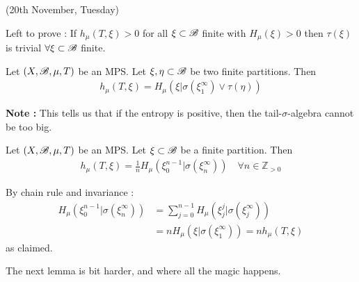 \documentclass[12pt,a4paper]{report}
\newenvironment{proof}
{\begin{changemargin}{1cm}{0.5cm} 
	}%
	{\end{changemargin}
}
\begin{document}
\newday

(20th November, Tuesday)
\s

Left to prove : If $h_{\mu}(T, \xi)>0$ for all $\xi \subset \mathscr{B}$ finite with $H_{\mu}(\xi) >0$ then $\tau(\xi)$ is trivial $\forall \xi \subset \mathscr{B}$ finite.
\s

\prop Let $(X, \mathscr{B}, \mu, T)$ be an MPS. Let $\xi, \eta \subset \mathscr{B}$ be two finite partitions. Then
\begin{align*}
h_{\mu}(T, \xi) = H_{\mu}(\xi | \sigma(\xi_1^{\infty}) \vee \tau (\eta))
\end{align*}
\s

\textbf{Note :} This tells us that if the entropy is positive, then the tail-$\sigma$-algebra cannot be too big.
\s

\lem Let $(X, \mathscr{B}, \mu, T)$ be an MPS. Let $\xi \subset \mathscr{B}$ be a finite partition. Then
\begin{align*}
h_{\mu}(T, \xi) = \frac{1}{n} H_{\mu} (\xi_0^{n-1} | \sigma(\xi_n^{\infty})) \quad \forall n \in \mathbb{Z}_{>0}
\end{align*}
\begin{proof}
\pf By chain rule and invariance :
\begin{align*}
H_{\mu}(\xi_0^{n-1} | \sigma(\xi_n^{\infty})) &= \sum_{j=0}^{n-1} H_{\mu}(\xi_j^j | \sigma(\xi_j^{\infty})) \\
&= n H_{\mu}(\xi | \sigma(\xi_1^{\infty})) = nh_{\mu}(T, \xi)
\end{align*}
as claimed.

\eop
\end{proof}
\s

The next lemma is bit harder, and where all the magic happens.
\s
\end{document}

